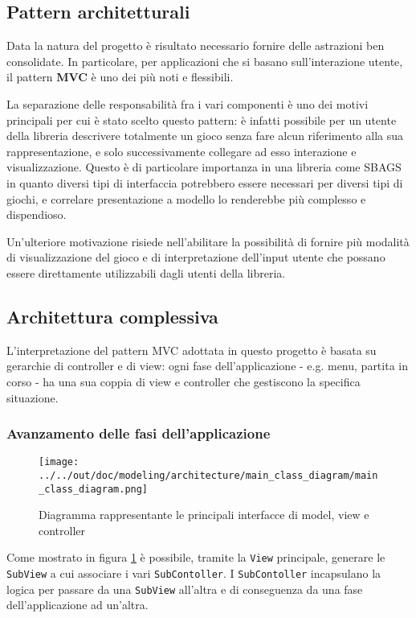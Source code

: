 \subsection{Pattern architetturali}
Data la natura del progetto è risultato necessario fornire delle astrazioni ben consolidate.
%
In particolare, per applicazioni che si basano sull'interazione utente, il pattern \textbf{MVC} è uno dei più noti e flessibili.

La separazione delle responsabilità fra i vari componenti è uno dei motivi principali per cui è stato scelto questo pattern: è infatti possibile per un utente della libreria descrivere totalmente un gioco senza fare alcun riferimento alla sua rappresentazione, e solo successivamente collegare ad esso interazione e visualizzazione.
%
Questo è di particolare importanza in una libreria come SBAGS in quanto diversi tipi di interfaccia potrebbero essere necessari per diversi tipi di giochi, e correlare presentazione a modello lo renderebbe più complesso e dispendioso.

Un'ulteriore motivazione risiede nell'abilitare la possibilità di fornire più modalità di visualizzazione del gioco e di interpretazione dell'input utente che possano essere direttamente utilizzabili dagli utenti della libreria.

\subsection{Architettura complessiva}
L'interpretazione del pattern MVC adottata in questo progetto è basata su gerarchie di controller e di view: ogni fase dell'applicazione - e.g. menu, partita in corso - ha una sua coppia di view e controller che gestiscono la specifica situazione.

\subsubsection{Avanzamento delle fasi dell'applicazione}
\begin{figure}
  \centering
  \texttt{[image: ../../out/doc/modeling/architecture/main\_class\_diagram/main\_class\_diagram.png]}
  \caption{Diagramma rappresentante le principali interfacce di model, view e controller}
  \label{fig:main_class_diagram}
\end{figure}
Come mostrato in figura \ref{fig:main_class_diagram} è possibile, tramite la \texttt{View} principale, generare le \texttt{SubView} a cui associare i vari \texttt{SubContoller}.
I \texttt{SubContoller} incapsulano la logica per passare da una \texttt{SubView} all'altra e di conseguenza da una fase dell'applicazione ad un'altra.


